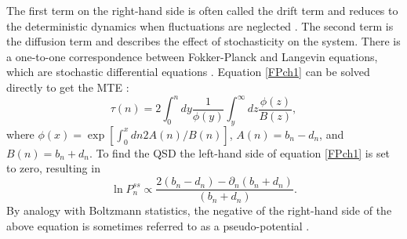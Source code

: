 The first term on the right-hand side is often called the drift term and reduces to the deterministic dynamics when fluctuations are neglected \cite{Gardiner2004a}. 
The second term is the diffusion term and describes the effect of stochasticity on the system. 
There is a one-to-one correspondence between Fokker-Planck and Langevin equations, which are stochastic differential equations \cite{Gardiner2004a}. 
Equation \ref{FPch1} can be solved directly to get the MTE \cite{Gardiner2004,Iyer-Biswas2015}: 
\begin{equation}
\tau(n) = 2\int_0^n dy \frac{1}{\phi(y)} \int_y^\infty dz \frac{\phi(z)}{B(z)},
\end{equation}
where $\phi(x) = \exp\left[\int_0^x dn 2 A(n)/B(n)\right]$, $A(n) = b_n - d_n$, and $B(n) = b_n + d_n$. 
To find the QSD the left-hand side of equation \ref{FPch1} is set to zero, resulting in \cite{Gardiner2004a}
\begin{equation}
\ln P_n^{ss} \propto \frac{2(b_n - d_n) - \partial_n(b_n + d_n)}{(b_n + d_n)}. 
\end{equation}
By analogy with Boltzmann statistics, the negative of the right-hand side of the above equation is sometimes referred to as a pseudo-potential \cite{Roozen1987,Grasman1996,Zhou2012,Yan2013}. 


